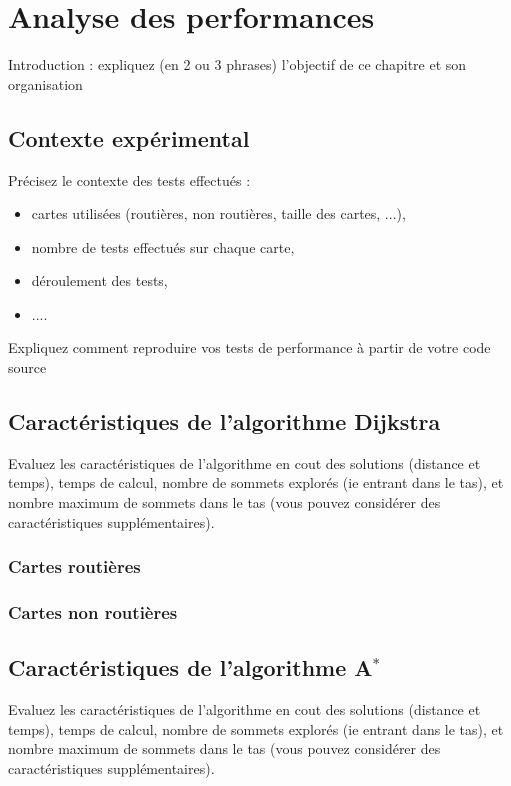 \chapter{Analyse des performances}

Introduction : expliquez (en 2 ou 3 phrases) l'objectif de ce chapitre et son organisation

\section{Contexte expérimental}
Précisez le contexte des tests effectués : 
\begin{itemize}
	\item cartes utilisées (routières, non routières, taille des cartes, ...),
	\item nombre de tests effectués sur chaque carte, 
	\item  déroulement des tests,
	\item ....
\end{itemize}
Expliquez comment reproduire vos tests de performance à partir de votre code source

\section{Caractéristiques de l'algorithme Dijkstra}
Evaluez les caractéristiques de l'algorithme en cout des solutions (distance et temps), temps de calcul, nombre de sommets explorés (ie entrant dans le tas), et nombre maximum de sommets dans le tas (vous pouvez considérer des caractéristiques supplémentaires).

\subsection{Cartes routières}

\subsection{Cartes non routières}

\section{Caractéristiques de l'algorithme A$^*$}
Evaluez les caractéristiques de l'algorithme en cout des solutions (distance et temps), temps de calcul, nombre de sommets explorés (ie entrant dans le tas), et nombre maximum de sommets dans le tas (vous pouvez considérer des caractéristiques supplémentaires).

